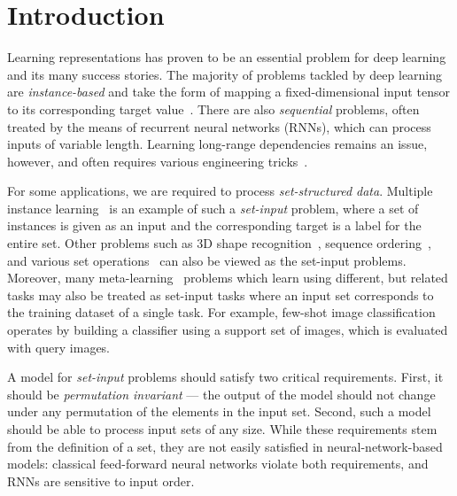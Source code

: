 \section{Introduction}
\label{sec:introduction}

Learning representations has proven to be an essential problem for deep learning and its many success stories.
The majority of problems tackled by deep learning are \textit{instance-based} and take the form of mapping a fixed-dimensional input tensor to its corresponding target value~\citep{krizhevsky2012imagenet, graves2013speech}.
There are also \textit{sequential} problems, often treated by the means of recurrent neural networks (RNNs), which can process inputs of variable length.
Learning long-range dependencies remains an issue, however, and often requires various engineering tricks~\citep{Le2015, Neil2016}.
\fi

For some applications, we are required to process \emph{set-structured data}.
Multiple instance learning~\citep{Dietterich1997, Maron1998} is an example of such a \textit{set-input} problem, where a set of instances is given as an input and the corresponding target is a label for the entire set.
Other problems such as 3D shape recognition~\citep{Wu2015, BaoguangShi2015, Su2015, Charles2017}, sequence ordering~\citep{Vinyals2016a}, and various set operations~\citep{muandet2012learning, oliva2013distribution, Edwards2017, Zaheer2017} can also be viewed as the set-input problems.
Moreover, many meta-learning~\citep{ThrunS98book, SchmidhuberJ87phd} problems which learn using different, 
but related tasks may also be treated as set-input tasks where an input set corresponds to the training dataset of a single task.
For example, few-shot image classification~\citep{finn2017model, Snell2017, Lee2018} operates by building a classifier using a support set of images, which is evaluated with query images.

A model for \textit{set-input} problems should satisfy two critical requirements.
First, it should be \textit{permutation invariant} --- the output of the model should not change under any permutation of the elements in the input set.
Second, such a model should be able to process input sets of any size.
While these requirements stem from the definition of a set, they are not easily satisfied in neural-network-based models: classical feed-forward neural networks violate both requirements, and RNNs are sensitive to input order.

